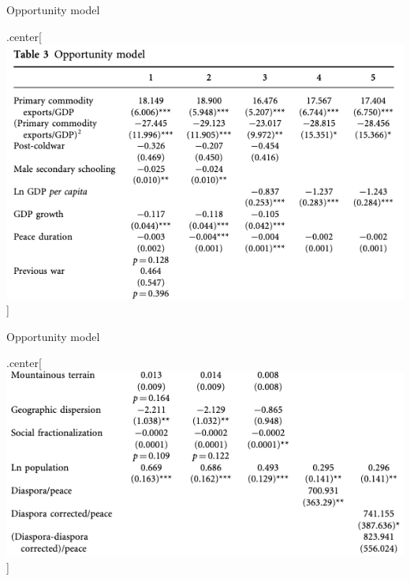 \documentclass[ignorenonframetext,]{beamer}
\begin{document}
\begin{frame}{Opportunity model}

\begin{block}{.center{[}\includegraphics{ch01.png}{]}}

\end{block}

\end{frame}

\begin{frame}{Opportunity model}

\begin{block}{.center{[}\includegraphics{ch02.png}{]}}

\end{block}

\end{frame}
\end{document}
